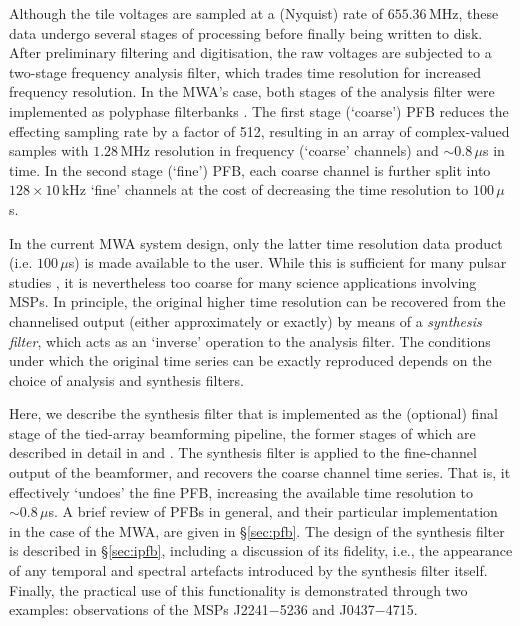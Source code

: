 \documentclass{pasa}%
\begin{document}
Although the tile voltages are sampled at a (Nyquist) rate of $655.36\,$MHz, these data undergo several stages of processing before finally being written to disk.
After preliminary filtering and digitisation, the raw voltages are subjected to a two-stage frequency analysis filter, which trades time resolution for increased frequency resolution.
In the MWA's case, both stages of the analysis filter were implemented as polyphase filterbanks \citep[PFBs;][\dots]{Harris2011,Prabu2015}.
The first stage (`coarse') PFB reduces the effecting sampling rate by a factor of 512, resulting in an array of complex-valued samples with $1.28\,$MHz resolution in frequency (`coarse' channels) and $\sim0.8\,\mu$s in time.
In the second stage (`fine') PFB, each coarse channel is further split into $128 \times 10\,$kHz `fine' channels at the cost of decreasing the time resolution to $100\,\mu$s.

In the current MWA system design, only the latter time resolution data product (i.e. $100\,\mu$s) is made available to the user.
While this is sufficient for many pulsar studies \citep[e.g.][]{Oronsaye2015,McSweeney2017,Bhat2018}, it is nevertheless too coarse for many science applications involving MSPs.
In principle, the original higher time resolution can be recovered from the channelised output (either approximately or exactly) by means of a \textit{synthesis filter}, which acts as an `inverse' operation to the analysis filter.
The conditions under which the original time series can be exactly reproduced depends on the choice of analysis and synthesis filters.

Here, we describe the synthesis filter that is implemented as the (optional) final stage of the tied-array beamforming pipeline, the former stages of which are described in detail in \citet[][hereafter Paper I]{Ord2019} and \citet[][hereafter Paper II]{Xue2019}.
The synthesis filter is applied to the fine-channel output of the beamformer, and recovers the coarse channel time series.
That is, it effectively `undoes' the fine PFB, increasing the available time resolution to $\sim 0.8\,\mu$s.
A brief review of PFBs in general, and their particular implementation in the case of the MWA, are given in \S\ref{sec:pfb}.
The design of the synthesis filter is described in \S\ref{sec:ipfb}, including a discussion of its fidelity, i.e., the appearance of any temporal and spectral artefacts introduced by the synthesis filter itself.
Finally, the practical use of this functionality is demonstrated through two examples: observations of the MSPs J2241$-$5236 and J0437$-$4715.
\end{document}

